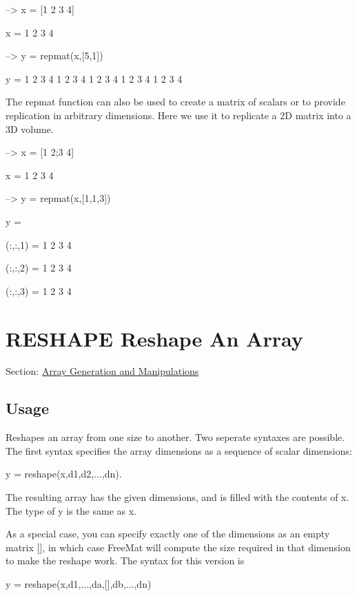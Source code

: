 \begin{DoxyVerbInclude}
--> x = [1 2 3 4]

x = 
 1 2 3 4 

--> y = repmat(x,[5,1])

y = 
 1 2 3 4 
 1 2 3 4 
 1 2 3 4 
 1 2 3 4 
 1 2 3 4 
\end{DoxyVerbInclude}


The {\ttfamily repmat} function can also be used to create a matrix of scalars or to provide replication in arbitrary dimensions. Here we use it to replicate a 2\-D matrix into a 3\-D volume.


\begin{DoxyVerbInclude}
--> x = [1 2;3 4]

x = 
 1 2 
 3 4 

--> y = repmat(x,[1,1,3])

y = 

(:,:,1) = 
 1 2 
 3 4 

(:,:,2) = 
 1 2 
 3 4 

(:,:,3) = 
 1 2 
 3 4 
\end{DoxyVerbInclude}
 \hypertarget{array_reshape}{}\section{R\-E\-S\-H\-A\-P\-E Reshape An Array}\label{array_reshape}
Section\-: \hyperlink{sec_array}{Array Generation and Manipulations} \hypertarget{vtkwidgets_vtkxyplotwidget_Usage}{}\subsection{Usage}\label{vtkwidgets_vtkxyplotwidget_Usage}
Reshapes an array from one size to another. Two seperate syntaxes are possible. The first syntax specifies the array dimensions as a sequence of scalar dimensions\-: \begin{DoxyVerb}   y = reshape(x,d1,d2,...,dn).
\end{DoxyVerb}
 The resulting array has the given dimensions, and is filled with the contents of {\ttfamily x}. The type of {\ttfamily y} is the same as {\ttfamily x}.

As a special case, you can specify exactly one of the dimensions as an empty matrix {\ttfamily \mbox{[}\mbox{]}}, in which case Free\-Mat will compute the size required in that dimension to make the reshape work. The syntax for this version is \begin{DoxyVerb}   y = reshape(x,d1,...,da,[],db,...,dn)
\end{DoxyVerb}


